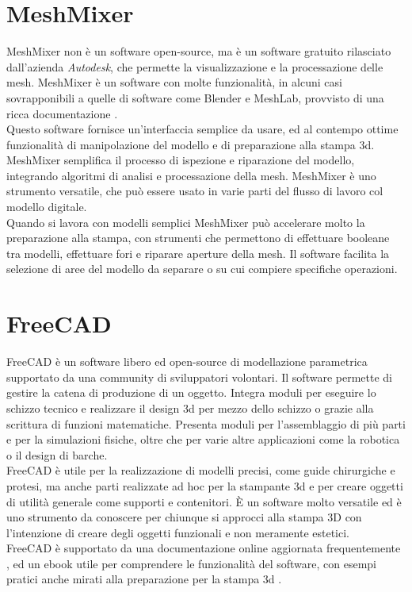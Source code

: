 \section{MeshMixer} 
MeshMixer \parencite{Reference38} non è un software open-source, ma è un software gratuito rilasciato dall'azienda \emph{Autodesk}, che permette la visualizzazione e la processazione delle mesh. MeshMixer è un software con molte funzionalità, in alcuni casi sovrapponibili a quelle di software come Blender e MeshLab, provvisto di una ricca documentazione \parencite{Reference39}. \\
Questo software fornisce un'interfaccia semplice da usare, ed al contempo ottime funzionalità di manipolazione del modello e di preparazione alla stampa 3d. MeshMixer semplifica il processo di ispezione e riparazione del modello, integrando algoritmi di analisi e processazione della mesh. MeshMixer è uno strumento versatile, che può essere usato in varie parti del flusso di lavoro col modello digitale.\\
Quando si lavora con modelli semplici MeshMixer può accelerare molto la preparazione alla stampa, con strumenti che permettono di effettuare booleane tra modelli, effettuare fori e riparare aperture della mesh. Il software facilita la selezione di aree del modello da separare o su cui compiere specifiche operazioni.

\section{FreeCAD}
FreeCAD \parencite{Reference40} è un software libero ed open-source di modellazione parametrica supportato da una community di sviluppatori volontari. Il software permette di gestire la catena di produzione di un oggetto. Integra moduli per eseguire lo schizzo tecnico e realizzare il design 3d per mezzo dello schizzo o grazie alla scrittura di funzioni matematiche. Presenta moduli per l'assemblaggio di più parti e per la simulazioni fisiche, oltre che per varie altre applicazioni come la robotica o il design di barche.\\
FreeCAD è utile per la realizzazione di modelli precisi, come guide chirurgiche e protesi, ma anche parti realizzate ad hoc per la stampante 3d e per creare oggetti di utilità generale come supporti e contenitori. È un software molto versatile ed è uno strumento da conoscere per chiunque si approcci alla stampa 3D con l'intenzione di creare degli oggetti funzionali e non meramente estetici.\\
FreeCAD è supportato da una documentazione online aggiornata frequentemente \parencite{Reference41}, ed un ebook utile per comprendere le funzionalità del software, con esempi pratici anche mirati alla preparazione per la stampa 3d \parencite{Reference42}.

